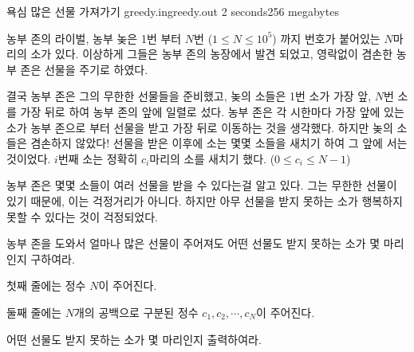 \begin{problem}{욕심 많은 선물 가져가기}
	{greedy.in}{greedy.out}
	{2 seconds}{256 megabytes}{}
	
	농부 존의 라이벌, 농부 놎은 1번 부터 $N$번 ($1 \le N \le 10^5$) 까지 번호가 붙어있는 $N$마리의 소가 있다. 이상하게 그들은 농부 존의 농장에서 발견 되었고, 영락없이 겸손한 농부 존은 선물을 주기로 하였다.
	
	결국 농부 존은 그의 무한한 선물들을 준비했고, 놎의 소들은 1번 소가 가장 앞, $N$번 소를 가장 뒤로 하여 농부 존의 앞에 일렬로 섰다. 농부 존은 각 시한마다 가장 앞에 있는 소가 농부 존으로 부터 선물을 받고 가장 뒤로 이동하는 것을 생각했다. 하지만 놎의 소들은 겸손하지 않았다! 선물을 받은 이후에 소는 몇몇 소들을 새치기 하여 그 앞에 서는 것이었다. $i$번째 소는 정확히 $c_i$마리의 소를 새치기 했다. ($0 \le c_i \le N-1$) 
	
	농부 존은 몇몇 소들이 여러 선물을 받을 수 있다는걸 알고 있다. 그는 무한한 선물이 있기 때문에, 이는 걱정거리가 아니다. 하지만 아무 선물을 받지 못하는 소가 행복하지 못할 수 있다는 것이 걱정되었다.
	
	농부 존을 도와서 얼마나 많은 선물이 주어져도 어떤 선물도 받지 못하는 소가 몇 마리인지 구하여라.
	
	
	\InputFile
	
	첫째 줄에는 정수 $N$이 주어진다.
	
	둘째 줄에는 $N$개의 공백으로 구분된 정수 $c_1, c_2, \cdots, c_N$이 주어진다.
	
	\OutputFile
	
	어떤 선물도 받지 못하는 소가 몇 마리인지 출력하여라.
	
	
	\Examples
	
	\begin{example}
	\end{example}

	
\end{problem}

